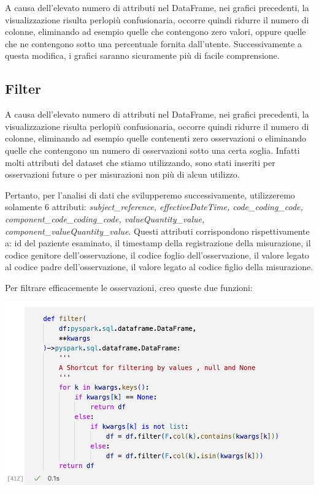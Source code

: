 \documentclass[11pt, oneside]{article}
\begin{document}
A causa dell'elevato numero di attributi nel DataFrame, nei grafici precedenti, la visualizzazione risulta perlopiù confusionaria, occorre quindi ridurre il numero di colonne, eliminando ad esempio quelle che contengono zero valori, oppure quelle che ne contengono sotto una percentuale fornita dall'utente. Successivamente a questa modifica, i grafici saranno sicuramente più di facile comprensione.

\subsection{Filter}

A causa dell'elevato numero di attributi nel DataFrame, nei grafici precedenti, la visualizzazione risulta perlopiù confusionaria, occorre quindi ridurre il numero di colonne, eliminando ad esempio quelle contenenti zero osservazioni o eliminando quelle che contengono un numero di osservazioni sotto una certa soglia. Infatti molti attributi del dataset che stiamo utilizzando, sono stati inseriti per osservazioni future o per misurazioni non più di alcun utilizzo.

Pertanto, per l'analisi di dati che svilupperemo successivamente, utilizzeremo solamente 6 attributi: \emph{subject\_reference, effectiveDateTime, code\_coding\_code, component\_code\_coding\_code, valueQuantity\_value, component\_valueQuantity\_value}. Questi attributi corrispondono rispettivamente a: id del paziente esaminato, il timestamp della registrazione della misurazione, il codice genitore dell'osservazione, il codice foglio dell'osservazione, il valore legato al codice padre dell'osservazione, il valore legato al codice figlio della misurazione.

Per filtrare efficacemente le osservazioni, creo queste due funzioni:

\begin{center}
\includegraphics[scale=0.45]{2_filter.png}
\end{center}
\end{document}

